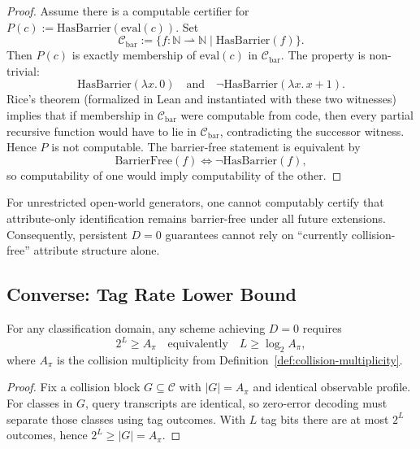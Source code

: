 \begin{proof}
Assume there is a computable certifier for $P(c):=\mathrm{HasBarrier}(\mathrm{eval}(c))$. Set
\[
\mathcal{C}_{\mathrm{bar}}:=\{f:\mathbb{N}\rightharpoonup\mathbb{N}\mid \mathrm{HasBarrier}(f)\}.
\]
Then $P(c)$ is exactly membership of $\mathrm{eval}(c)$ in $\mathcal{C}_{\mathrm{bar}}$. The property is non-trivial:
\[
\mathrm{HasBarrier}(\lambda x.\,0)\quad\text{and}\quad \neg\mathrm{HasBarrier}(\lambda x.\,x+1).
\]
Rice's theorem (formalized in Lean and instantiated with these two witnesses) implies that if membership in $\mathcal{C}_{\mathrm{bar}}$ were computable from code, then every partial recursive function would have to lie in $\mathcal{C}_{\mathrm{bar}}$, contradicting the successor witness. Hence $P$ is not computable. The barrier-free statement is equivalent by
\[
\mathrm{BarrierFree}(f)\iff \neg\mathrm{HasBarrier}(f),
\]
so computability of one would imply computability of the other.
\end{proof}

\begin{corollary}[Certification consequence for persistent \texorpdfstring{$D=0$}{D=0} claims]
For unrestricted open-world generators, one cannot computably certify that attribute-only identification remains barrier-free under all future extensions. Consequently, persistent $D=0$ guarantees cannot rely on ``currently collision-free'' attribute structure alone.
\end{corollary}

\subsection{Converse: Tag Rate Lower Bound}

\begin{theorem}[Converse]\label{thm:converse}
For any classification domain, any scheme achieving $D=0$ requires
\[
2^L \ge A_\pi
\quad\text{equivalently}\quad
L \ge \log_2 A_\pi,
\]
where $A_\pi$ is the collision multiplicity from Definition~\ref{def:collision-multiplicity}.
\end{theorem}

\begin{proof}
Fix a collision block $G \subseteq \mathcal{C}$ with $|G|=A_\pi$ and identical observable profile. For classes in $G$, query transcripts are identical, so zero-error decoding must separate those classes using tag outcomes. With $L$ tag bits there are at most $2^L$ outcomes, hence $2^L \ge |G| = A_\pi$.
\end{proof}


